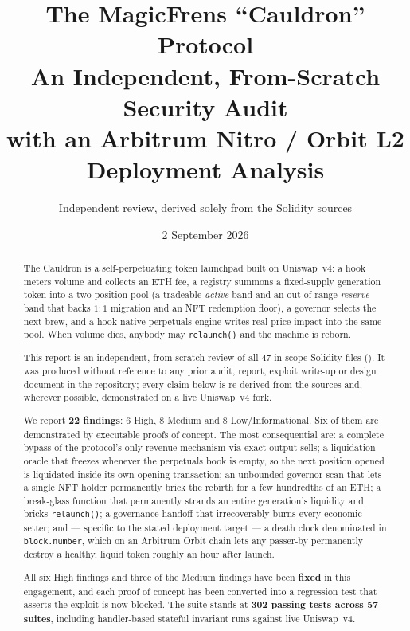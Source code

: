 \documentclass[10pt,a4paper]{article}
\title{\vspace{-1.2cm}\textbf{The MagicFrens ``Cauldron'' Protocol}\\[2mm]
\large An Independent, From-Scratch Security Audit\\[1mm]
\normalsize with an Arbitrum Nitro / Orbit L2 Deployment Analysis}
\author{Independent review, derived solely from the Solidity sources}
\date{2 September 2026}
\newcommand{\code}[1]{\texttt{\small #1}}
\begin{document}
\maketitle
\thispagestyle{fancy}

\begin{abstract}
\noindent
The Cauldron is a self-perpetuating token launchpad built on Uniswap~v4: a hook meters
volume and collects an ETH fee, a registry summons a fixed-supply generation token into
a two-position pool (a tradeable \emph{active} band and an out-of-range \emph{reserve}
band that backs $1{:}1$ migration and an NFT redemption floor), a governor selects the
next brew, and a hook-native perpetuals engine writes real price impact into the same
pool. When volume dies, anybody may \code{relaunch()} and the machine is reborn.

This report is an independent, from-scratch review of all 47 in-scope Solidity files
(\unskip). It was produced without reference to any prior
audit, report, exploit write-up or design document in the repository; every claim below
is re-derived from the sources and, wherever possible, demonstrated on a live Uniswap~v4
fork.

We report \textbf{22 findings}: 6 High, 8 Medium and 8 Low/Informational. Six of them are
demonstrated by executable proofs of concept. The most consequential are: a complete
bypass of the protocol's only revenue mechanism via exact-output sells; a liquidation
oracle that freezes whenever the perpetuals book is empty, so the next position opened is
liquidated inside its own opening transaction; an unbounded governor scan that lets a
single NFT holder permanently brick the rebirth for a few hundredths of an ETH; a
break-glass function that permanently strands an entire generation's liquidity and
bricks \code{relaunch()}; a governance handoff that irrecoverably burns every economic
setter; and --- specific to the stated deployment target --- a death clock denominated in
\code{block.number}, which on an Arbitrum Orbit chain lets any passer-by permanently
destroy a healthy, liquid token roughly an hour after launch.

All six High findings and three of the Medium findings have been \textbf{fixed} in this
engagement, and each proof of concept has been converted into a regression test that
asserts the exploit is now blocked. The suite stands at \textbf{302 passing tests across
57 suites}, including handler-based stateful invariant runs against live Uniswap~v4.
\end{abstract}
\end{document}

